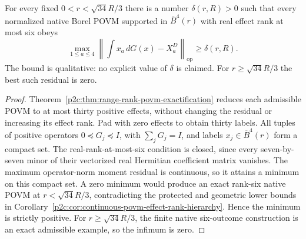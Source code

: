 \documentclass[12pt,a4paper]{article}
\begin{document}
\begin{corollary}
\label{p2c:cor:rank6-universal-noise-floor}
For every fixed $0<r<\sqrt{34}R/3$ there is a number
$\delta(r,R)>0$ such that every normalized native Borel POVM
supported in $\overline B^4(r)$ with real effect rank at most six
obeys
\[
 \max_{1\le a\le4}
 \left\|\int x_a\,dG(x)-X_a^D\right\|_{\mathrm{op}}
 \ge\delta(r,R).
\]
The bound is qualitative: no explicit value of $\delta$ is claimed.
For $r\ge\sqrt{34}R/3$ the best such residual is zero.
\end{corollary}
\begin{proof}
Theorem~\ref{p2c:thm:range-rank-povm-exactification}
reduces each admissible POVM to at most thirty positive effects,
without changing the residual or increasing its effect rank.
Pad with zero effects to obtain thirty labels.  All tuples of
positive operators $0\preceq G_j\preceq I$, with $\sum_jG_j=I$,
and labels $x_j\in\overline B^4(r)$ form a compact set.
The real-rank-at-most-six condition is closed, since every
seven-by-seven minor of their vectorized real Hermitian coefficient
matrix vanishes.  The maximum operator-norm moment residual is
continuous, so it attains a minimum on this compact set.  A zero
minimum would produce an exact rank-six native POVM at
$r<\sqrt{34}R/3$, contradicting the protected and geometric
lower bounds in
Corollary~\ref{p2c:cor:continuous-povm-effect-rank-hierarchy}.
Hence the minimum is strictly positive.
For $r\ge\sqrt{34}R/3$, the finite native six-outcome construction
is an exact admissible example, so the infimum is zero.
\end{proof}
\end{document}

